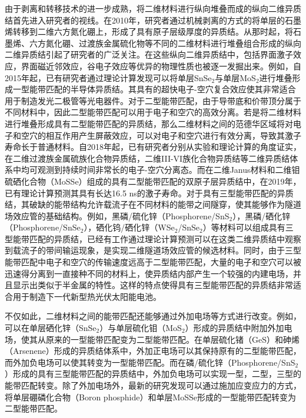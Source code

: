     由于剥离和转移技术的进一步成熟，将二维材料进行纵向堆叠而成的纵向二维异质结首先进入研究者的视线。在2010年，研究者通过机械剥离的方式的将单层的石墨烯转移到二维六方氮化硼上，形成了具有原子层级厚度的异质结。从那时起，将石墨烯、六方氮化硼、过渡族金属硫化物等不同的二维材料进行堆叠组合形成的纵向二维异质结引起了研究者的广泛关注。在这些纵向二维异质结中，包括界面激子效应，界面磁近邻效应，谷电子效应等优异的物理性质也被逐一发掘出来。例如，自2015年起，已有研究者通过理论计算发现可以将单层SnSe$_2$与单层MoS$_2$进行堆叠形成一型能带匹配的半导体异质结。其具有的超快电子-空穴复合效应使其非常适合用于制造发光二极管等光电器件。对于二型能带匹配，由于导带底和价带顶分属于不同材料中，因此二型能带匹配可以用于电子和空穴的高效分离。若是将二维材料进行堆叠形成具有二型能带匹配的异质结，那么二维材料之间的范德华区域将对电子和空穴的相互作用产生屏蔽效应，可以对电子和空穴进行有效分离，导致其激子寿命长于普通材料。自2018年起，已有研究者分别从实验和理论计算的角度证实，在二维过渡族金属硫族化合物异质结，二维III-VI族化合物异质结等二维异质结体系中均可观测到持续时间非常长的电子-空穴分离态。而在二维Janus材料和二维钼硫硒化合物（MoSSe）组成的具有二型能带匹配的双原子层异质结中，在2019年，已有理论计算预测其具有长达16.5 ns的激子寿命。对于具有三型能带匹配的异质结，其破缺的能带结构允许载流子在不同材料的能带之间隧穿，使其能够作为隧道场效应管的基础结构。例如，黑磷/硫化锌（Phosphorene/SnS$_2$），黑磷/硒化锌（Phosphorene/SnSe$_2$），硒化钨/硒化锌（WSe$_2$/SnSe$_2$）等材料可以组成具有三型能带匹配的异质结，已经有工作通过理论计算预测可以在这类二维异质结中观察到载流子的带间输运现象，是实现二维隧道场效应管的候选材料。同时，由于三型能带匹配中电子和空穴的传输速度远高于二型能带匹配，大量的电子和空穴可以被迅速得分离到一直接种不同的材料上，使异质结内部产生一个较强的内建电场，并且显示出类似于半金属的特性。这样的特点使得具有三型能带匹配的异质结非常适合用于制造下一代新型热光伏太阳能电池。

    不仅如此，二维材料之间的能带匹配还能够通过外加电场等方式进行改变。例如，可以在单层硒化锌（SnSe$_2$）与单层硫化钼（MoS$_2$）形成的异质结中附加外加电场，使其从原来的一型能带匹配变为二型能带匹配。在单层硫化锗（GeS）和砷烯（Arsenene）形成的异质结体系中，外加正电场可以其保持原有的二型能带匹配，而外加负电场可以使其转变为一型能带匹配。而在磷/硫化锌（Phosphorene/SnS$_2$）形成的具有三型能带匹配的异质结中，外加负电场可以实现一型，二型，三型的能带匹配转变。除了外加电场外，最新的研究发现可以通过施加应变应力的方式，将单层硼磷化合物（Boron phosphide）和单层MoSSe形成的一型能带匹配转变为二型能带匹配。

